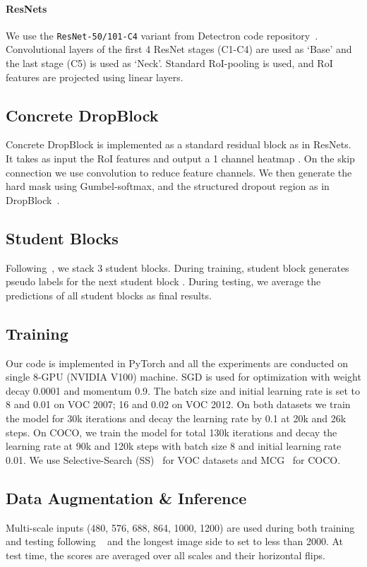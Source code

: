 \documentclass[10pt,twocolumn,letterpaper]{article}
\begin{document}
\paragraph{ResNets} We use the \texttt{ResNet-50/101-C4} variant from Detectron code repository~\cite{Detectron2018}. Convolutional layers of the first 4 ResNet stages (C1-C4) are used as `Base' and the last stage (C5) is used as `Neck'. Standard RoI-pooling is used, and RoI features are projected using linear layers.

\subsection{Concrete DropBlock}
Concrete DropBlock is implemented as a standard residual block as in ResNets. It takes as input the RoI features and output a 1 channel heatmap . On the skip connection we use  convolution to reduce feature channels. We then generate the hard mask  using Gumbel-softmax, and the structured dropout region as in DropBlock~\cite{dropblock}.

\subsection{Student Blocks}
Following~\cite{tang2017multiple}, we stack 3 student blocks. During training, student block  generates pseudo labels for the next student block . During testing, we average the predictions of all student blocks as final results.

\subsection{Training}
Our code is implemented in PyTorch and all the experiments are conducted on single 8-GPU (NVIDIA V100) machine. SGD is used for optimization with weight decay 0.0001 and momentum 0.9. The batch size and initial learning rate is set to 8 and 0.01 on VOC 2007; 16 and 0.02 on VOC 2012. On both datasets we train the model for 30k iterations and decay the learning rate by 0.1 at 20k and 26k steps. On COCO, we train the model for total 130k iterations and decay the learning rate at 90k and 120k steps with batch size 8 and initial learning rate 0.01. We use Selective-Search (SS)~\cite{ss} for VOC datasets and MCG~\cite{mcg} for COCO.

\subsection{Data Augmentation \& Inference}
Multi-scale inputs (480, 576, 688, 864, 1000, 1200) are used during both  training and testing following ~\cite{tang2017multiple,KantorovOCL16} and the longest image side to set to less than 2000.
At test time, the scores are averaged over all scales and their horizontal flips. 
\end{document}
